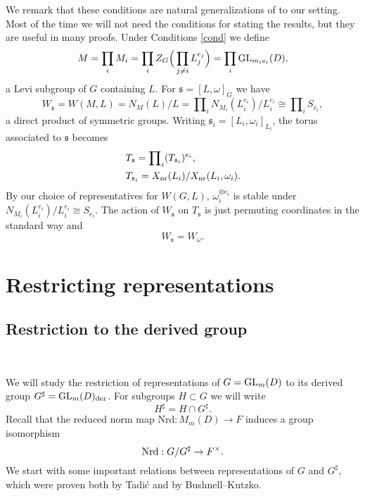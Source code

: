 \documentclass[11pt]{amsart}
\theoremstyle{definition}
\begin{document}
We remark that these conditions are natural generalizations of \cite[\S 1.2]{GoRo2}
to our setting. Most of the time we will not need the conditions for stating the results, 
but they are useful in many proofs. Under Conditions \ref{cond} we define \label{i:84}
\begin{equation}\label{eq:1.1}
M = \prod_i M_i = \prod_i Z_G \Big( \prod_{j \neq i} L_j^{e_j} \Big) = 
\prod_i {{\rm GL}}_{m_i e_i}(D) ,
\end{equation}
a Levi subgroup of $G$ containing $L$. For ${{\mathfrak s}} = [L,\omega]_G$ we have
\begin{equation}\label{eq:1.2}
W_{{\mathfrak s}} = W(M,L) = N_M (L) / L = \prod\nolimits_i N_{M_i}(L_i^{e_i}) / L_i^{e_i} 
\cong \prod\nolimits_i S_{e_i} , 
\end{equation}
a direct product of symmetric groups. Writing ${{\mathfrak s}}_i = [L_i,\omega_i]_{L_i}$, 
the torus associated to ${{\mathfrak s}}$ becomes
\begin{align}
\label{eq:1.4} & T_{{\mathfrak s}} = \prod\nolimits_i ( T_{{{\mathfrak s}}_i} )^{e_i} , \\
& T_{{{\mathfrak s}}_i} = X_{{\rm nr}} (L_i) / X_{{\rm nr}} (L_i ,\omega_i) .
\end{align}
By our choice of representatives for $W(G,L) ,\, \omega_i^{\otimes e_i}$ is stable under
$N_{M_i}(L_i^{e_i}) / L_i^{e_i} \cong S_{e_i}$. The action of $W_{{\mathfrak s}}$ on $T_{{\mathfrak s}}$
is just permuting coordinates in the standard way and
\begin{equation}\label{eq:1.3}
W_{{\mathfrak s}} = W_\omega .
\end{equation}

\section{Restricting representations}
\label{sec:restrict}

\subsection{Restriction to the derived group} \
\label{par:res1}

We will study the restriction of representations of $G = {{\rm GL}}_m (D)$ to its derived group 
$G^\sharp = {{\rm GL}}_m (D)_{{\rm der}}$. For subgroups $H \subset G$ we will write  
\label{i:18}\label{i:19}
\[
H^\sharp = H \cap G^\sharp . 
\]
Recall that the reduced norm map Nrd$: M_m (D) \to F$ induces a group isomorphism \label{i:39}
\[
{{\rm Nrd}} : G / G^\sharp \to F^\times. 
\]
We start with some important relations between representations of $G$ and $G^\sharp$,
which were proven both by Tadi\'c and by Bushnell--Kutzko.
\end{document}
